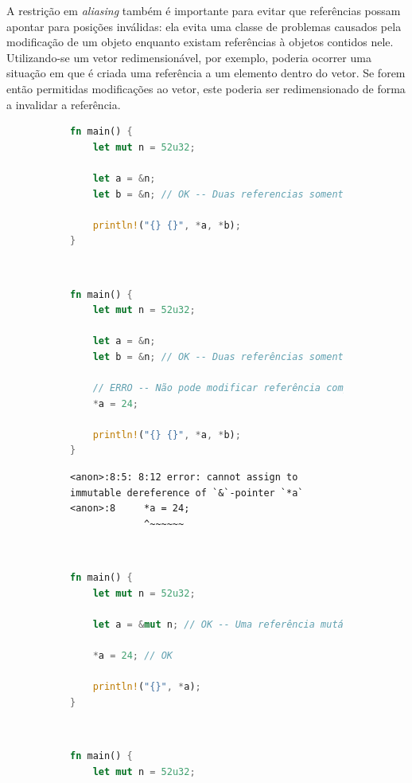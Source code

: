 \documentclass[tg]{mdtufsm}
\begin{document}
A restrição em \emph{aliasing} também é importante para evitar que referências possam apontar para posições inválidas: ela evita uma classe de problemas causados pela modificação de um objeto enquanto existam referências à objetos contidos nele. Utilizando-se um vetor redimensionável, por exemplo, poderia ocorrer uma situação em que é criada uma referência a um elemento dentro do vetor. Se forem então permitidas modificações ao vetor, este poderia ser redimensionado de forma a invalidar a referência. \citep{rust-lifetimes}

\begin{figure}
	\centering
	\begin{subfigure}[c]{0.48\textwidth}
	\begin{lstlisting}[language=Rust]
fn main() {
	let mut n = 52u32;

	let a = &n;
	let b = &n; // OK -- Duas referencias somente-leitura

	println!("{} {}", *a, *b);
}
	\end{lstlisting}
	\caption{}
	\label{code:aliasing:shared1}
	\end{subfigure}
	~~~
	\begin{subfigure}[c]{0.48\textwidth}
	\begin{lstlisting}[language=Rust]
fn main() {
	let mut n = 52u32;

	let a = &n;
	let b = &n; // OK -- Duas referências somente-leitura

	// ERRO -- Não pode modificar referência compartilhada
	*a = 24;

	println!("{} {}", *a, *b);
}
	\end{lstlisting}
	\begin{lstlisting}[numbers=none, breaklines=true]
<anon>:8:5: 8:12 error: cannot assign to immutable dereference of `&`-pointer `*a`
<anon>:8     *a = 24;
             ^~~~~~~
	\end{lstlisting}
	\caption{}
	\label{code:aliasing:shared2}
	\end{subfigure}
	\\[2em]
	\begin{subfigure}[c]{0.48\textwidth}
	\begin{lstlisting}[language=Rust]
fn main() {
	let mut n = 52u32;

	let a = &mut n; // OK -- Uma referência mutável

	*a = 24; // OK

	println!("{}", *a);
}
	\end{lstlisting}
	\caption{}
	\label{code:aliasing:mut1}
	\end{subfigure}
	~~~
	\begin{subfigure}[c]{0.48\textwidth}
	\begin{lstlisting}[language=Rust]
fn main() {
	let mut n = 52u32;


\end{lstlisting}
\end{subfigure}
\end{figure}
\end{document}
